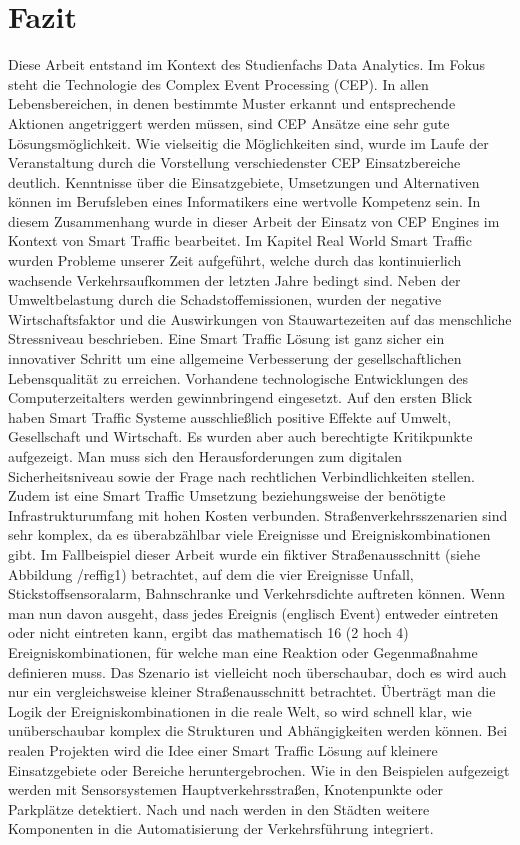 \section{Fazit}

Diese Arbeit entstand im Kontext des Studienfachs Data Analytics. Im Fokus steht die Technologie des Complex Event Processing (CEP). In allen Lebensbereichen, in denen bestimmte Muster erkannt und entsprechende Aktionen angetriggert werden müssen, sind CEP Ansätze eine sehr gute Lösungsmöglichkeit. Wie vielseitig die Möglichkeiten sind, wurde im Laufe der Veranstaltung durch die Vorstellung verschiedenster CEP Einsatzbereiche deutlich. Kenntnisse über die Einsatzgebiete, Umsetzungen und Alternativen können im Berufsleben eines Informatikers eine wertvolle Kompetenz sein. In diesem Zusammenhang wurde in dieser Arbeit der Einsatz von CEP Engines im Kontext von Smart Traffic bearbeitet.
Im Kapitel Real World Smart Traffic wurden Probleme unserer Zeit aufgeführt, welche durch das kontinuierlich wachsende Verkehrsaufkommen der letzten Jahre bedingt sind. Neben der Umweltbelastung durch die Schadstoffemissionen, wurden der negative Wirtschaftsfaktor und die Auswirkungen von Stauwartezeiten auf das menschliche Stressniveau beschrieben. Eine Smart Traffic Lösung ist ganz sicher ein innovativer Schritt um eine allgemeine Verbesserung der gesellschaftlichen Lebensqualität zu erreichen. Vorhandene technologische Entwicklungen des Computerzeitalters werden gewinnbringend eingesetzt. Auf den ersten Blick haben Smart Traffic Systeme ausschließlich positive Effekte auf Umwelt, Gesellschaft und Wirtschaft. Es wurden aber auch berechtigte Kritikpunkte aufgezeigt. Man muss sich den Herausforderungen zum digitalen Sicherheitsniveau sowie der Frage nach rechtlichen Verbindlichkeiten stellen. Zudem ist eine Smart Traffic Umsetzung beziehungsweise der benötigte Infrastrukturumfang mit hohen Kosten verbunden. Straßenverkehrsszenarien sind sehr komplex, da es überabzählbar viele Ereignisse und Ereigniskombinationen gibt. Im Fallbeispiel dieser Arbeit wurde ein fiktiver Straßenausschnitt (siehe Abbildung /ref{fig1}) betrachtet, auf dem die vier Ereignisse Unfall, Stickstoffsensoralarm, Bahnschranke und Verkehrsdichte auftreten können. Wenn man nun davon ausgeht, dass jedes Ereignis (englisch Event) entweder eintreten oder nicht eintreten kann, ergibt das mathematisch 16 (2 hoch 4) Ereigniskombinationen, für welche man eine Reaktion oder Gegenmaßnahme definieren muss. Das Szenario ist vielleicht noch überschaubar, doch es wird auch nur ein vergleichsweise kleiner Straßenausschnitt betrachtet. Überträgt man die Logik der Ereigniskombinationen in die reale Welt, so wird schnell klar, wie unüberschaubar komplex die Strukturen und Abhängigkeiten werden können. Bei realen Projekten wird die Idee einer Smart Traffic Lösung auf kleinere Einsatzgebiete oder Bereiche heruntergebrochen. Wie in den Beispielen aufgezeigt werden mit Sensorsystemen Hauptverkehrsstraßen, Knotenpunkte oder Parkplätze detektiert. Nach und nach werden in den Städten weitere Komponenten in die Automatisierung der Verkehrsführung integriert.
